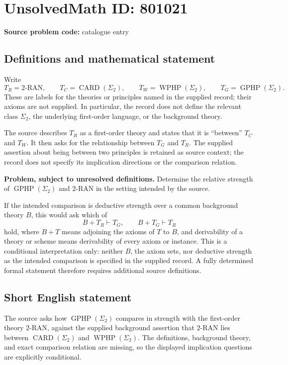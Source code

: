 \documentclass[11pt]{article}
\begin{document}
\section*{UnsolvedMath ID: 801021}
\textbf{Source problem code:} catalogue entry
\subsection{Definitions and mathematical statement}
Write
\[
T_R=\text{2-RAN},\qquad
T_C=\operatorname{CARD}(\Sigma_2),\qquad
T_W=\operatorname{WPHP}(\Sigma_2),\qquad
T_G=\operatorname{GPHP}(\Sigma_2).
\]
These are labels for the theories or principles named in the supplied record; their axioms are not supplied. In particular, the record does not define the relevant class \(\Sigma_2\), the underlying first-order language, or the background theory.

The source describes \(T_R\) as a first-order theory and states that it is ``between'' \(T_C\) and \(T_W\). It then asks for the relationship between \(T_G\) and \(T_R\). The supplied assertion about being between two principles is retained as source context; the record does not specify its implication directions or the comparison relation.

\textbf{Problem, subject to unresolved definitions.} Determine the relative strength of \(\operatorname{GPHP}(\Sigma_2)\) and \(\text{2-RAN}\) in the setting intended by the source.

If the intended comparison is deductive strength over a common background theory \(B\), this would ask which of
\[
B+T_R\vdash T_G,
\qquad
B+T_G\vdash T_R
\]
hold, where \(B+T\) means adjoining the axioms of \(T\) to \(B\), and derivability of a theory or scheme means derivability of every axiom or instance. This is a conditional interpretation only: neither \(B\), the axiom sets, nor deductive strength as the intended comparison is specified in the supplied record. A fully determined formal statement therefore requires additional source definitions.
\subsection{Short English statement}
The source asks how \(\operatorname{GPHP}(\Sigma_2)\) compares in strength with the first-order theory \(\text{2-RAN}\), against the supplied background assertion that \(\text{2-RAN}\) lies between \(\operatorname{CARD}(\Sigma_2)\) and \(\operatorname{WPHP}(\Sigma_2)\). The definitions, background theory, and exact comparison relation are missing, so the displayed implication questions are explicitly conditional.
\end{document}
